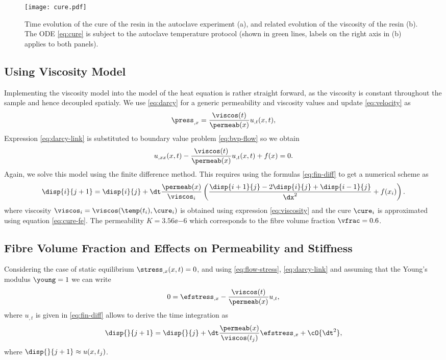 \documentclass[twoside,a4paper,12pt]{article}
\begin{document}
\begin{figure}
  \centering
  \texttt{[image: cure.pdf]}
  \caption{Time evolution of the cure of the resin in the autoclave
    experiment (a), and related evolution of the viscosity of the
    resin (b). The ODE \eqref{eq:cure} is subject to the autoclave
    temperature protocol (shown in green lines, labels on the right
    axis in (b) applies to both panels).}
  \label{fig:cure-exp}
\end{figure}


\subsection{Using Viscosity Model}


Implementing the viscosity model into the model of the heat equation
is rather straight forward, as the viscosity is constant throughout
the sample and hence decoupled spatialy. 
%
We use \eqref{eq:darcy} for a generic permeability and viscosity
values and update \eqref{eq:velocity} as
%
\begin{align}
 \press_{,x} =\frac{\viscos(t)}{\permeab(x)}    u_{,t}(x,t) ,  \label{eq:darcy-link}
\end{align}
%
Expression \eqref{eq:darcy-link} is substituted to boundary value problem \eqref{eq:bvp-flow}
so we obtain
%
\begin{align}
   u_{,xx}(x,t) - \frac{\viscos(t)}{\permeab(x)}    u_{,t}(x,t) + f(x) =0.
\end{align}
%
Again, we solve this model using the finite difference method. This
requires using the formulas \eqref{eq:fin-diff} to get a numerical scheme as
%
\begin{align}
  \disp{i}{j+1}  =   \disp{i}{j} + \dt\frac{\permeab(x)}{\viscos_i}\left(\frac{\disp{i+1}{j} - 2\disp{i}{j} + \disp{i-1}{j}}{\dx^2}   + f(x_i) \right). 
\end{align}
%
where viscosity $\viscos_i = \viscos(\temp(t_i),\cure_i)$ is obtained
using expression \eqref{eq:viscosity} and the cure $\cure_i$ is
approximated using equation \eqref{eq:cure-fe}. The permeability
$K=3.56\ee{-6}$ which corresponds to the fibre volume fraction $\vfrac = 0.6$.

\subsection{Fibre Volume Fraction and Effects on Permeability and Stiffness}

Considering the case of static equilibrium $\stress_{,x}(x,t)=0$, and
using \eqref{eq:flow-stress}, \eqref{eq:darcy-link} and assuming that
the Young's modulus $\young = 1$ we can write
%
\begin{align}
  0 = \efstress_{,x} - \frac{\viscos(t)}{\permeab(x)}    u_{,t}, \label{eq:flow-stres_x}
\end{align}
%
where $u_{,t}$ is given in \eqref{eq:fin-diff} allows to derive the
time integration as
\begin{align}
  \disp{}{j+1} = \disp{}{j} + \dt \frac{\permeab(x)}{\viscos(t_j)}\efstress_{,x} + \cO{\dt^2},
\end{align}
%
where $\disp{}{j+1} \approx u(x,t_j)$.
\end{document}
